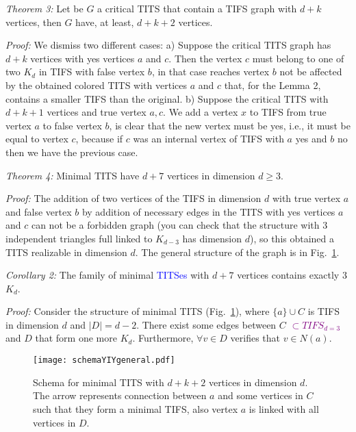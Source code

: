 \documentclass[%
  twocolumn,
 showpacs,
 showkeys,
 preprintnumbers,
 amsmath,amssymb,
 aps,
  pra,
  longbibliography,
 floatfix,
 ]{revtex4-1}
\newcommand{\karl}[1]{\textcolor{blue}{#1}}
\newcommand{\jr}[1]{\textcolor{purple}{#1}}
\def\endproof{ }
\begin{document}
{\em Theorem 3:} Let be $G$ a critical TITS that contain a TIFS graph with $d+k$ vertices, then $G$ have, at least, $d+k+2$ vertices.

{\em Proof:} We dismiss two different cases: a) Suppose the critical TITS graph has $d+k$ vertices with yes vertices $a$ and $c$. Then the vertex $c$ must belong to one of two $K_d$ in TIFS with false vertex $b$, in that case reaches vertex $b$ not be affected by the obtained colored TITS with vertices $a$ and $c$ that, for the Lemma 2, contains a smaller TIFS than the original. b) Suppose the critical TITS with $d+k+1$ vertices and true vertex $a, c$. We add a vertex $x$ to TIFS from true vertex $a$ to false vertex $b$, is clear that the new vertex must be yes, i.e., it must be equal to vertex $c$, because if $c$ was an internal vertex of TIFS with $a$ yes and $b$ no then we have the previous case. \endproof

{\em Theorem 4:} Minimal TITS have $d+7$ vertices in dimension $d\geq 3$.

{\em Proof:} The addition of two vertices of the TIFS in dimension $d$ with true vertex $a$ and false vertex $b$ by addition of necessary edges in the TITS with yes vertices $a$ and $c$ can not be a forbidden graph (you can check that the structure with 3 independent triangles full linked to $K_{d-3}$ has dimension $d$), so this obtained a TITS realizable in dimension $d$. The general structure of the graph is in Fig.~\ref{Fig3}. \endproof



{\em Corollary 2:} The family of minimal \karl{TITSes} with $d+7$ vertices contains exactly 3 $K_d$.

{\em Proof:} Consider the structure of minimal TITS (Fig.~\ref{Fig3}), where $\{a\} \cup C$ is TIFS in dimension $d$ and $|D| = d-2$. There exist some edges between $C $ \jr{\sout{$\subset TIFS_{d=3}$}} and $D$ that form one more $K_d$. Furthermore, $\forall v \in D$ verifies that $v \in N(a)$. \endproof


\begin{figure}
\centering
\centerline{\texttt{[image: schemaYIYgeneral.pdf]}}
\caption{\label{Fig3} Schema for minimal TITS with $d+k+2$ vertices in dimension $d$.
The arrow represents connection between $a$ and some vertices in $C$ such that they form a minimal TIFS,
also vertex $a$ is linked with all vertices in $D$.}
\end{figure}
\end{document}
